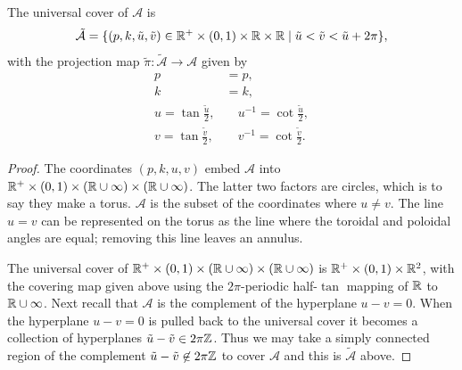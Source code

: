 \documentclass{article}
\begin{document}
\begin{lem}
    \label{lem:mathcal tilde C}
The universal cover of $\mathcal{A}$ is
\[
\mathcal{\tilde{A}} =
\{(p, k,\tilde{u},\tilde{v}) \in \mathbb{R}^+\times(0,1)\times\mathbb{R}\times\mathbb{R} \mid  \tilde{u} < \tilde{v} < \tilde{u} + 2\pi \},
\]
with the projection map $\tilde{\pi} : \mathcal{\tilde{A}} \to \mathcal{A}$ given by
\begin{align*}
    p &= p, \\
    k &= k, \\
    u = \tan \frac{\tilde{u}}{2},       &\quad
        u^{-1} = \cot \frac{\tilde{u}}{2},  \\
    v = \tan \frac{\tilde{v}}{2},       &\quad
        v^{-1} = \cot \frac{\tilde{v}}{2}.
\end{align*}

\begin{proof}
The coordinates $(p,k,u,v)$ embed $\mathcal{A}$ into $\mathbb{R}^+\times(0,1)\times(\mathbb{R} \cup\infty)\times(\mathbb{R} \cup\infty)$.
The latter two factors are circles, which is to say they make a torus. $\mathcal{A}$ is the subset of the coordinates where $u\neq v$. The line $u=v$ can be represented on the torus as the line where the toroidal and poloidal angles are equal; removing this line leaves an annulus.

The universal cover of $\mathbb{R}^+\times(0,1)\times(\mathbb{R} \cup\infty)\times(\mathbb{R} \cup\infty)$ is $\mathbb{R}^+\times(0,1)\times\mathbb{R}^2$, with the covering map given above using the $2\pi$-periodic half-$\tan$ mapping of $\mathbb{R}$ to $\mathbb{R}\cup\infty$. Next recall that $\mathcal{A}$ is the complement of the hyperplane $u-v = 0$. When the hyperplane $u-v=0$ is pulled back to the universal cover it becomes a collection of hyperplanes $\tilde{u}-\tilde{v} \in 2\pi\mathbb{Z}$. Thus we may take a simply connected region of the complement $\tilde{u}-\tilde{v} \not\in 2\pi\mathbb{Z}$ to cover $\mathcal{A}$ and this is $\mathcal{\tilde{A}}$ above.




\end{proof}
\end{lem}
\end{document}
